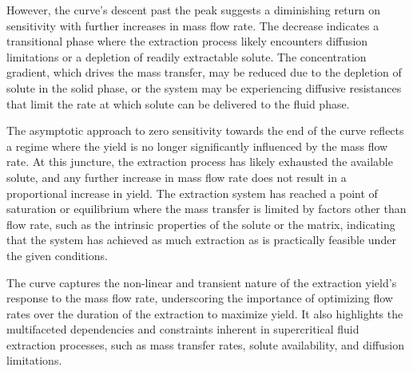 \documentclass[../Article_Sensitivity_Analsysis.tex]{subfiles}
\begin{document}
	However, the curve’s descent past the peak suggests a diminishing return on sensitivity with further increases in mass flow rate. The decrease indicates a transitional phase where the extraction process likely encounters diffusion limitations or a depletion of readily extractable solute. The concentration gradient, which drives the mass transfer, may be reduced due to the depletion of solute in the solid phase, or the system may be experiencing diffusive resistances that limit the rate at which solute can be delivered to the fluid phase.
	
	The asymptotic approach to zero sensitivity towards the end of the curve reflects a regime where the yield is no longer significantly influenced by the mass flow rate. At this juncture, the extraction process has likely exhausted the available solute, and any further increase in mass flow rate does not result in a proportional increase in yield. The extraction system has reached a point of saturation or equilibrium where the mass transfer is limited by factors other than flow rate, such as the intrinsic properties of the solute or the matrix, indicating that the system has achieved as much extraction as is practically feasible under the given conditions.
	
	The curve captures the non-linear and transient nature of the extraction yield's response to the mass flow rate, underscoring the importance of optimizing flow rates over the duration of the extraction to maximize yield. It also highlights the multifaceted dependencies and constraints inherent in supercritical fluid extraction processes, such as mass transfer rates, solute availability, and diffusion limitations.

        
\end{document}
